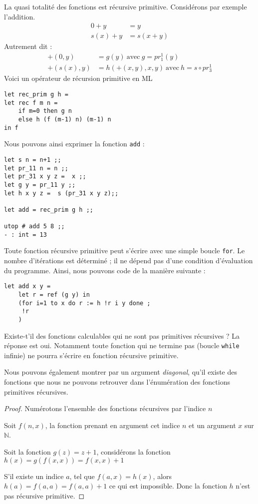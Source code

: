 La quasi totalité des fonctions est récursive primitive. Considérons par exemple l'addition.
\begin{align*}
	0 + y &= y  \\
	s(x) + y &= s(x+y) 
\end{align*}
Autrement dit :
\begin{align*}
	+ (0, y) &=  g(y)\ \text{avec}\ g=pr_1^1 (y) \\
	+ (s(x), y) &= h (+(x, y), x, y)\ \text{avec}\ h=s \circ  pr_3^1
\end{align*}
Voici un opérateur de récursion primitive en ML
\begin{Verbatim}
let rec_prim g h = 
let rec f m n = 
	if m=0 then g n 
	else h (f (m-1) n) (m-1) n
in f 
\end{Verbatim}
Nous pouvons ainsi exprimer la fonction \verb+add+ :
\begin{Verbatim}
let s n = n+1 ;;
let pr_11 n = n ;;
let pr_31 x y z =  x ;;
let g y = pr_11 y ;;
let h x y z =  s (pr_31 x y z);;

let add = rec_prim g h ;;

utop # add 5 8 ;;
- : int = 13
\end{Verbatim}
Toute fonction récursive primitive peut s'écrire avec une simple boucle \verb+for+.
Le nombre d'itérations est déterminé ; il ne dépend pas d'une condition d'évaluation du programme.
Ainsi, nous pouvons code de la manière suivante :
\begin{Verbatim}
let add x y =
	let r = ref (g y) in
	(for i=1 to x do r := h !r i y done ; 
	 !r
	)
\end{Verbatim}
Existe-t'il des fonctions calculables qui ne sont pas primitives récursives ?
La réponse est oui. Notamment toute fonction qui ne termine pas (boucle \verb+while+ infinie)
ne pourra s'écrire en fonction récursive primitive.


Nous pouvons également montrer par un  argument \textit{diagonal}, qu'il existe des fonctions que nous ne 
pouvons retrouver dans l'énumération des fonctions primitives récursives.
\begin{proof}
	Numérotons l'ensemble des fonctions récursives par l'indice $n$

	Soit $f(n,x)$, la fonction prenant en argument cet indice $n$ et un argument $x$ sur $\mathbb{N}$.
       
	Soit la fonction $g(z)=z+1$, considérons la fonction $h(x)=g(f(x,x))=f(x,x)+1$

        S'il existe un indice $a$, tel que $f(a,x)=h(x)$, alors $h(a)=f(a,a)=f(a,a)+1$ ce qui est 
	impossible. Donc la fonction $h$ n'est pas récursive primitive.

\end{proof}

